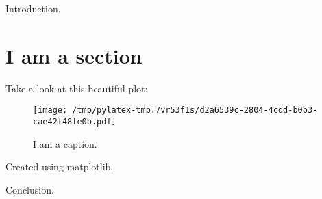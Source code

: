 \documentclass{article}%
\begin{document}
%
\normalsize%
Introduction.%
\section{I am a section}%
\label{sec:Iamasection}%
Take a look at this beautiful plot:%


\begin{figure}[htbp]%
\centering%
\texttt{[image: /tmp/pylatex-tmp.7vr53f1s/d2a6539c-2804-4cdd-b0b3-cae42f48fe0b.pdf]}%
\caption{I am a caption.}%
\end{figure}

%
Created using matplotlib.

%
Conclusion.%
\end{document}
